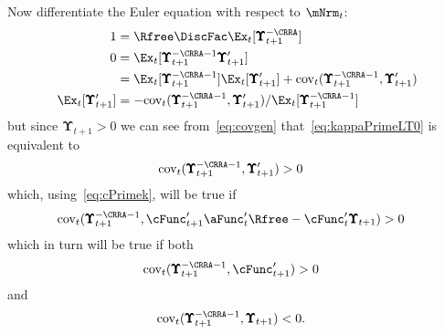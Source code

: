 \documentclass[\econtexRoot/BufferStockTheory]{subfiles}
\begin{document}
Now differentiate the Euler equation with respect to $\mNrm_{t}$:
\begin{equation}\label{eq:covgen}\begin{split}
  1  & = \Rfree \DiscFac \Ex_{t}[ \pmb{\Upsilon}_{t+1}^{-\CRRA}] 
  \\ 0  & = \Ex_{t}[\pmb{\Upsilon}_{t+1}^{-\CRRA-1} \pmb{\Upsilon}_{t+1}^{\prime}] 
  \\  & = \Ex_{t}[\pmb{\Upsilon}_{t+1}^{-\CRRA-1}]\Ex_{t}[\pmb{\Upsilon}_{t+1}^{\prime}]+\mbox{cov}_{t}(\pmb{\Upsilon}_{t+1}^{-\CRRA-1},\pmb{\Upsilon}_{t+1}^{\prime}) 
  \\ \Ex_{t}[\pmb{\Upsilon}_{t+1}^{\prime}]  & = -\mbox{cov}_{t}(\pmb{\Upsilon}_{t+1}^{-\CRRA-1},\pmb{\Upsilon}_{t+1}^{\prime})/\Ex_{t}[\pmb{\Upsilon}_{t+1}^{-\CRRA-1}] 
\end{split}\end{equation}
but since $\pmb{\Upsilon}_{t+1} > 0$ we can see from~\eqref{eq:covgen} that~\eqref{eq:kappaPrimeLT0} is equivalent to
\begin{equation}\begin{gathered}\begin{aligned}
  \mbox{cov}_{t}(\pmb{\Upsilon}_{t+1}^{-\CRRA-1},\pmb{\Upsilon}_{t+1}^{\prime})  & > 0 \nonumber
\end{aligned}\end{gathered}\end{equation}
which, using~\eqref{eq:cPrimek}, will be true if
\begin{equation}\begin{gathered}\begin{aligned}
  \mbox{cov}_{t}(\pmb{\Upsilon}_{t+1}^{-\CRRA-1},\cFunc^{\prime}_{t+1}\aFunc^{\prime}_{t}\Rfree - \cFunc^{\prime}_{t}\pmb{\Upsilon}_{t+1})  & > 0 \notag
\end{aligned}\end{gathered}\end{equation}
which in turn will be true if both
\begin{equation}\begin{gathered}\begin{aligned}
  \mbox{cov}_{t}(\pmb{\Upsilon}_{t+1}^{-\CRRA-1},\cFunc^{\prime}_{t+1} )  & > 0 \notag
\end{aligned}\end{gathered}\end{equation}
and
\begin{align*}
  \mbox{cov}_{t}(\pmb{\Upsilon}_{t+1}^{-\CRRA-1},\pmb{\Upsilon}_{t+1})  & < 0. \notag
\end{align*}
\end{document}

